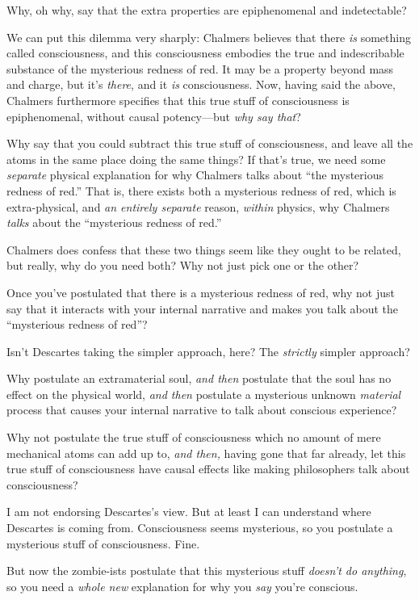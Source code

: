 {
 Why, oh why, say that the extra properties are epiphenomenal and
indetectable?}

{
 We can put this dilemma very sharply: Chalmers believes that there
\textit{is} something called consciousness, and this consciousness
embodies the true and indescribable substance of the mysterious redness
of red. It may be a property beyond mass and charge, but
it's \textit{there}, and it \textit{is} consciousness.
Now, having said the above, Chalmers furthermore specifies that this
true stuff of consciousness is epiphenomenal, without causal
potency---but \textit{why say that}?}

{
 Why say that you could subtract this true stuff of consciousness,
and leave all the atoms in the same place doing the same things? If
that's true, we need some \textit{separate} physical
explanation for why Chalmers talks about ``the
mysterious redness of red.'' That is, there exists
both a mysterious redness of red, which is extra-physical, and
\textit{an entirely separate} reason, \textit{within} physics, why
Chalmers \textit{talks} about the ``mysterious redness
of red.''}

{
 Chalmers does confess that these two things seem like they ought
to be related, but really, why do you need both? Why not just pick one
or the other?}

{
 Once you've postulated that there is a mysterious
redness of red, why not just say that it interacts with your internal
narrative and makes you talk about the ``mysterious
redness of red''?}

{
 Isn't Descartes taking the simpler approach, here?
The \textit{strictly} simpler approach?}

{
 Why postulate an extramaterial soul, \textit{and then} postulate
that the soul has no effect on the physical world, \textit{and then}
postulate a mysterious unknown \textit{material} process that causes
your internal narrative to talk about conscious experience?}

{
 Why not postulate the true stuff of consciousness which no amount
of mere mechanical atoms can add up to, \textit{and then,} having gone
that far already, let this true stuff of consciousness have causal
effects like making philosophers talk about consciousness?}

{
 I am not endorsing Descartes's view. But at least
I can understand where Descartes is coming from. Consciousness seems
mysterious, so you postulate a mysterious stuff of consciousness.
Fine.}

{
 But now the zombie-ists postulate that this mysterious stuff
\textit{doesn't do anything}, so you need a
\textit{whole new} explanation for why you \textit{say}
you're conscious.}

